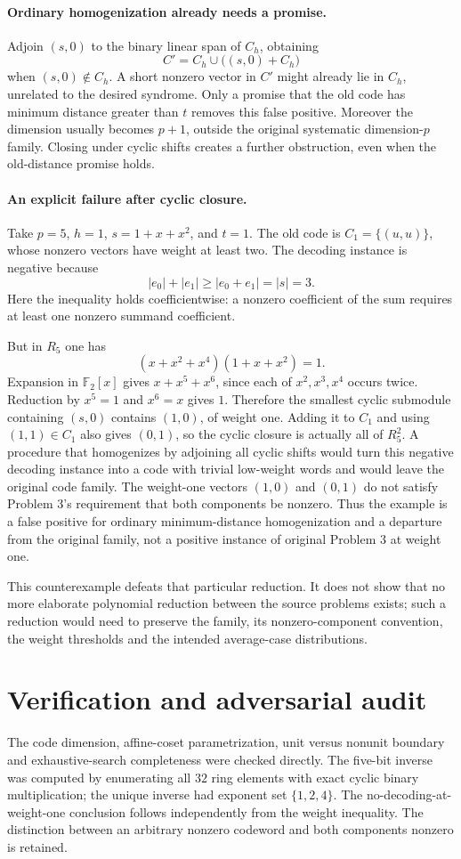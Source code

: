 \documentclass[11pt]{article}
\begin{document}
\paragraph{Ordinary homogenization already needs a promise.}
Adjoin $(s,0)$ to the binary linear span of $C_h$, obtaining
\[
 C'=C_h\cup\bigl((s,0)+C_h\bigr)
\]
when $(s,0)\notin C_h$. A short nonzero vector in $C'$ might already lie in $C_h$, unrelated to the desired syndrome. Only a promise that the old code has minimum distance greater than $t$ removes this false positive. Moreover the dimension usually becomes $p+1$, outside the original systematic dimension-$p$ family. Closing under cyclic shifts creates a further obstruction, even when the old-distance promise holds.

\paragraph{An explicit failure after cyclic closure.}
Take $p=5$, $h=1$, $s=1+x+x^2$, and $t=1$. The old code is $C_1=\{(u,u)\}$, whose nonzero vectors have weight at least two. The decoding instance is negative because
\[
 |e_0|+|e_1|\ge |e_0+e_1|=|s|=3.
\]
Here the inequality holds coefficientwise: a nonzero coefficient of the sum requires at least one nonzero summand coefficient.

But in $R_5$ one has
\[
 (x+x^2+x^4)(1+x+x^2)=1.
\]
Expansion in $\mathbb F_2[x]$ gives $x+x^5+x^6$, since each of $x^2,x^3,x^4$ occurs twice. Reduction by $x^5=1$ and $x^6=x$ gives $1$. Therefore the smallest cyclic submodule containing $(s,0)$ contains $(1,0)$, of weight one. Adding it to $C_1$ and using $(1,1)\in C_1$ also gives $(0,1)$, so the cyclic closure is actually all of $R_5^2$. A procedure that homogenizes by adjoining all cyclic shifts would turn this negative decoding instance into a code with trivial low-weight words and would leave the original code family. The weight-one vectors $(1,0)$ and $(0,1)$ do not satisfy Problem 3's requirement that both components be nonzero. Thus the example is a false positive for ordinary minimum-distance homogenization and a departure from the original family, not a positive instance of original Problem 3 at weight one.

This counterexample defeats that particular reduction. It does not show that no more elaborate polynomial reduction between the source problems exists; such a reduction would need to preserve the family, its nonzero-component convention, the weight thresholds and the intended average-case distributions.
\section{Verification and adversarial audit}
The code dimension, affine-coset parametrization, unit versus nonunit boundary and exhaustive-search completeness were checked directly. The five-bit inverse was computed by enumerating all $32$ ring elements with exact cyclic binary multiplication; the unique inverse had exponent set $\{1,2,4\}$. The no-decoding-at-weight-one conclusion follows independently from the weight inequality. The distinction between an arbitrary nonzero codeword and both components nonzero is retained.
\end{document}
